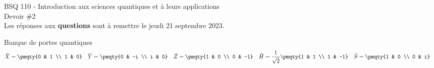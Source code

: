 \documentclass[11pt]{article}
\begin{document}
\begin{center}
  {\Large BSQ 110 - Introduction aux sciences quantiques et à leurs applications} \\ \vspace{5mm}
  {\LARGE\sffamily Devoir \#2} \\
  Les réponses aux \textbf{questions} sont à remettre le jeudi 21 septembre 2023.
\end{center}

\def\exerpath{questions}

\begin{remarque}
  Banque de portes quantiques
  \begin{align*}
    \hat{X} = \pmqty{0 & 1 \\ 1 & 0} \quad \hat{Y} = \pmqty{0 & -i \\ i & 0} \quad \hat{Z} = \pmqty{1 & 0 \\ 0 & -1} \quad \hat{H} = \frac{1}{\sqrt{2}}\pmqty{1 & 1 \\ 1 & -1} \quad \hat{S} = \pmqty{1 & 0 \\ 0 & i}
  \end{align*}
\end{remarque}



\end{document}
